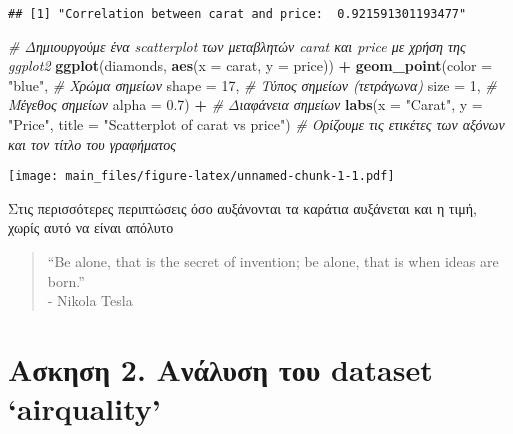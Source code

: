 \documentclass[
]{article}
\newenvironment{Shaded}{\begin{snugshade}}{\end{snugshade}}
\newcommand{\AttributeTok}[1]{\textcolor[rgb]{0.13,0.29,0.53}{#1}}
\newcommand{\CommentTok}[1]{\textcolor[rgb]{0.56,0.35,0.01}{\textit{#1}}}
\newcommand{\DecValTok}[1]{\textcolor[rgb]{0.00,0.00,0.81}{#1}}
\newcommand{\FloatTok}[1]{\textcolor[rgb]{0.00,0.00,0.81}{#1}}
\newcommand{\FunctionTok}[1]{\textcolor[rgb]{0.13,0.29,0.53}{\textbf{#1}}}
\newcommand{\NormalTok}[1]{#1}
\newcommand{\SpecialCharTok}[1]{\textcolor[rgb]{0.81,0.36,0.00}{\textbf{#1}}}
\newcommand{\StringTok}[1]{\textcolor[rgb]{0.31,0.60,0.02}{#1}}
\begin{document}
\begin{verbatim}
## [1] "Correlation between carat and price:  0.921591301193477"
\end{verbatim}

\begin{Shaded}
\begin{Highlighting}[]
\CommentTok{\# Δημιουργούμε ένα scatterplot των μεταβλητών \textquotesingle{}carat\textquotesingle{} και \textquotesingle{}price\textquotesingle{} με χρήση της ggplot2}
\FunctionTok{ggplot}\NormalTok{(diamonds, }\FunctionTok{aes}\NormalTok{(}\AttributeTok{x =}\NormalTok{ carat, }\AttributeTok{y =}\NormalTok{ price)) }\SpecialCharTok{+}
  \FunctionTok{geom\_point}\NormalTok{(}\AttributeTok{color =} \StringTok{"blue"}\NormalTok{,  }\CommentTok{\# Χρώμα σημείων}
             \AttributeTok{shape =} \DecValTok{17}\NormalTok{,       }\CommentTok{\# Τύπος σημείων (τετράγωνα)}
             \AttributeTok{size =} \DecValTok{1}\NormalTok{,         }\CommentTok{\# Μέγεθος σημείων}
             \AttributeTok{alpha =} \FloatTok{0.7}\NormalTok{) }\SpecialCharTok{+}    \CommentTok{\# Διαφάνεια σημείων}
  \FunctionTok{labs}\NormalTok{(}\AttributeTok{x =} \StringTok{"Carat"}\NormalTok{, }\AttributeTok{y =} \StringTok{"Price"}\NormalTok{, }\AttributeTok{title =} \StringTok{"Scatterplot of carat vs price"}\NormalTok{)  }\CommentTok{\# Ορίζουμε τις ετικέτες των αξόνων και τον τίτλο του γραφήματος}
\end{Highlighting}
\end{Shaded}

\texttt{[image: main\_files/figure-latex/unnamed-chunk-1-1.pdf]}

Στις περισσότερες περιπτώσεις όσο αυξάνονται τα καράτια αυξάνεται και η
τιμή, χωρίς αυτό να είναι απόλυτο

\begin{quote}
``Be alone, that is the secret of invention; be alone, that is when
ideas are born.''\\
- Nikola Tesla
\end{quote}

\hypertarget{ux3b1ux3c3ux3baux3b7ux3c3ux3b7-2.-ux3b1ux3bdux3acux3bbux3c5ux3c3ux3b7-ux3c4ux3bfux3c5-dataset-airquality}{%
\section{Ασκηση 2. Ανάλυση του dataset
`airquality'}\label{ux3b1ux3c3ux3baux3b7ux3c3ux3b7-2.-ux3b1ux3bdux3acux3bbux3c5ux3c3ux3b7-ux3c4ux3bfux3c5-dataset-airquality}}
\end{document}
